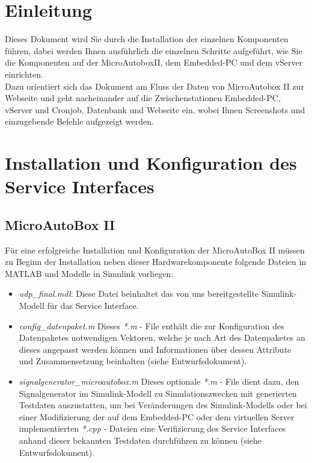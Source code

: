 \documentclass[fontsize = 12pt, paper = a4]{scrreprt}
\begin{document}
\chapter{Einleitung}

Dieses Dokument wird Sie durch die Installation der 
einzelnen Komponenten führen, dabei werden Ihnen ausführlich 
die einzelnen Schritte aufgeführt, wie Sie die Komponenten 
auf der MicroAutoboxII, dem Embedded-PC und dem vServer 
einrichten. \\
Dazu orientiert sich das Dokument am Fluss der 
Daten von MicroAutobox II zur Webseite und geht nacheinander 
auf die Zwischenstationen Embedded-PC, vServer und Cronjob, 
Datenbank und Webseite ein, wobei Ihnen Screenshots und 
einzugebende Befehle aufgezeigt werden.


\chapter{Installation und Konfiguration des Service Interfaces}



\section{MicroAutoBox II}

Für eine erfolgreiche Installation und Konfiguration der MicroAutoBox II müssen zu Beginn der Installation neben dieser Hardwarekomponente folgende Dateien in MATLAB und Modelle in Simulink vorliegen:

\begin{itemize}

\item \textit{udp\_final.mdl}: Diese Datei beinhaltet das von uns bereitgestellte Simulink-Modell für das Service Interface.

\item \textit{config\_datenpaket.m} Dieses \textit{*.m} - File enthält die zur Konfiguration des Datenpaketes notwendigen Vektoren, welche je nach Art des Datenpaketes an dieses angepasst werden können und Informationen über dessen Attribute und Zusammensetzung beinhalten (siehe Entwurfsdokument).

\item \textit{signalgenerator\_microautobox.m} Dieses optionale \textit{*.m} - File dient dazu, den Signalgenerator im Simulink-Modell zu Simulationszwecken mit generierten Testdaten auszustatten, um bei Veränderungen des Simulink-Modells oder bei einer Modifizierung der   auf dem Embedded-PC oder dem virtuellen Server implementierten \textit{*.cpp} - Dateien eine Verifizierung des Service Interfaces anhand dieser bekannten Testdaten durchführen zu können (siehe Entwurfsdokument).

\end{itemize} 
\end{document}
